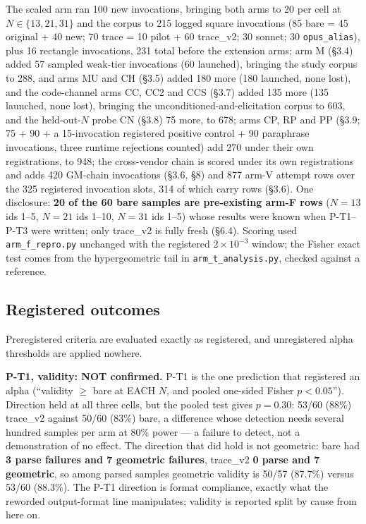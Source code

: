 The scaled arm ran 100 new invocations, bringing both arms to 20 per cell at $N \in \{13, 21, 31\}$ and
the corpus to 215 logged square invocations (85 bare = 45 original + 40 new; 70 trace = 10 pilot +
60 trace\_v2; 30 sonnet; 30 \texttt{opus\_alias}), plus 16 rectangle invocations, 231 total before the
extension arms; arm M (\S3.4) added 57 sampled
weak-tier invocations (60 launched), bringing the study corpus to 288, and
arms MU and CH (\S3.5) added 180 more (180 launched, none lost), and the code-channel arms
CC, CC2 and CCS (\S3.7) added 135 more (135 launched, none lost), bringing the
unconditioned-and-elicitation corpus to 603, and the held-out-$N$ probe CN (\S3.8) 75 more, to 678; arms CP, RP and PP (\S3.9; 75 + 90 + a 15-invocation registered positive control + 90 paraphrase invocations, three runtime rejections counted) add 270 under their own registrations, to 948; the cross-vendor chain is scored under its own
registrations and adds 420 GM-chain invocations (\S3.6, \S8) and 877 arm-V attempt rows over
the 325 registered invocation slots, 314 of which carry rows (\S3.6). One disclosure: \textbf{20 of the 60 bare samples are pre-existing arm-F
rows} ($N = 13$ ids 1--5, $N = 21$ ids 1--10, $N = 31$ ids 1--5) whose results were known when P-T1--P-T3
were written; only trace\_v2 is fully fresh (\S6.4). Scoring used \texttt{arm\_f\_repro.py} unchanged with
the registered $2\times10^{-3}$ window; the Fisher exact test comes from the hypergeometric tail in
\texttt{arm\_t\_analysis.py}, checked against a reference.

\subsection{Registered outcomes}

Preregistered criteria are evaluated exactly as registered, and unregistered alpha thresholds are
applied nowhere.

\textbf{P-T1, validity: NOT confirmed.} P-T1 is the one prediction that registered an alpha (``validity
$\ge$ bare at EACH $N$, and pooled one-sided Fisher $p < 0.05$''). Direction held at all three cells, but
the pooled test gives $p = 0.30$: 53/60 (88\%) trace\_v2 against 50/60 (83\%) bare, a difference whose
detection needs several hundred samples per arm at 80\% power --- a failure to detect, not a
demonstration of no effect. The direction that did hold is not geometric: bare
had \textbf{3 parse failures and 7 geometric failures}, trace\_v2 \textbf{0 parse and 7 geometric}, so among
parsed samples geometric validity is 50/57 (87.7\%) versus 53/60 (88.3\%). The P-T1 direction is
format compliance, exactly what the reworded output-format line manipulates; validity is reported
split by cause from here on.

